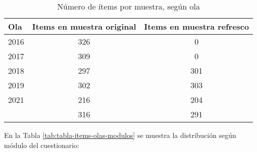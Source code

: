 \documentclass[
  12pt,
]{article}
\begin{document}
\begin{table}[H]

\caption{\label{tab:tabla-items-olas}Número de ítems por muestra, según ola}
\centering
\begin{tabular}[t]{lcc}
\toprule
Ola & Items en muestra original & Items en muestra refresco\\
\midrule
2016 & 326 & 0\\
2017 & 309 & 0\\
2018 & 297 & 301\\
2019 & 302 & 303\\
2021 & 216 & 204\\
\addlinespace
2022 & 316 & 291\\
\bottomrule
\end{tabular}
\end{table}

En la Tabla \ref{tab:tabla-items-olas-modulos} se muestra la distribución según módulo del cuestionario:
\end{document}

